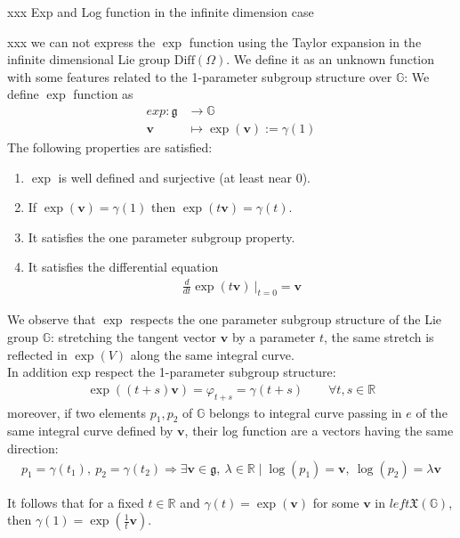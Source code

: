xxx Exp and Log function in the infinite dimension case

xxx we can not express the $\exp$ function using the Taylor expansion in the infinite dimensional Lie group $\text{Diff}(\Omega)$. We define it as an unknown function with some features related to the 1-parameter subgroup structure over $\mathbb{G}$:
We define $\exp$ function as
\begin{align*}
exp : \mathfrak{g} & \longrightarrow  \mathbb{G}   \\
\mathbf{v} &\longmapsto \exp(\mathbf{v}):= \gamma(1)
\end{align*}
The following properties are satisfied:
\begin{enumerate}
	\item $\exp$ is well defined and surjective (at least near 0).
	\item If $\exp(\mathbf{v}) = \gamma(1)$ then $\exp(t\mathbf{v}) = \gamma(t)$.
	\item It satisfies the one parameter subgroup property.
	\item It satisfies the differential equation
	\begin{align*}
	\frac{d}{dt} \exp(t\mathbf{v})~\Bigr|_{t=0} = \mathbf{v}
	\end{align*}
\end{enumerate}

We observe that $\exp$ respects the one parameter subgroup structure of the Lie group $\mathbb{G}$: stretching the tangent vector $\mathbf{v}$ by a parameter $t$, the same stretch is reflected in $\exp(V)$ along the same integral curve.\\ 
In addition exp respect the 1-parameter subgroup structure:
\begin{align*}
\exp((t+s)\mathbf{v}) = \varphi_{t+s} = \gamma(t+s) \qquad \forall t,s \in \mathbb{R}
\end{align*}
moreover, if two elements $p_1 , p_2$ of $\mathbb{G}$ belongs to integral curve passing in $e$ of the same integral curve defined by $\mathbf{v}$, their log function are a vectors having the same direction:
\begin{align*}
p_1 = \gamma(t_1), ~ p_2 = \gamma(t_2) \Rightarrow \exists \mathbf{v} \in \mathfrak{g}, ~ \lambda \in \mathbb{R}\mid \log(p_1) = \mathbf{v} , ~ \log(p_2) = \lambda \mathbf{v}
\end{align*}

It follows that for a fixed $t \in \mathbb{R}$ and $\gamma(t) = \exp(\mathbf{v} )$ for some $\mathbf{v} $ in $left\mathfrak{X}(\mathbb{G})$, then $\gamma(1) = \exp(\frac{1}{t}\mathbf{v})$.

